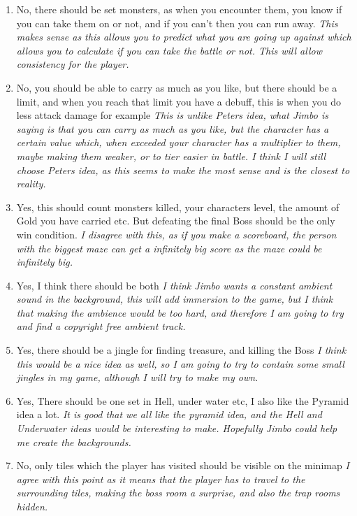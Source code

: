 \documentclass[14pt]{article}
\begin{document}
\begin{enumerate}
	\item{No, there should be set monsters, as when you encounter them, you know if you can take them on or not, and if you can't then you can run away.}
	\em{This makes sense as this allows you to predict what you are going up against which allows you to calculate if you can take the battle or not. This will allow consistency for the player.}
	
	\item{No, you should be able to carry as much as you like, but there should be a limit, and when you reach that limit you have a debuff, this is when you do less attack damage for example}
	\em{This is unlike Peters idea, what Jimbo is saying is that you can carry as much as you like, but the character has a certain value which, when exceeded your character has a multiplier to them, maybe making them weaker, or to tier easier in battle. I think I will still choose Peters idea, as this seems to make the most sense and is the closest to reality.}
	
	\item{Yes, this should count monsters killed, your characters level, the amount of Gold you have carried etc. But defeating the final Boss should be the only win condition.}
	\em{I disagree with this, as if you make a scoreboard, the person with the biggest maze can get a infinitely big score as the maze could be infinitely big.}
	
	\item{Yes, I think there should be both}
	\em{I think Jimbo wants a constant ambient sound in the background, this will add immersion to the game, but I think that making the ambience would be too hard, and therefore I am going to try and find a copyright free ambient track.}
	
	\item{Yes, there should be a jingle for finding treasure, and killing the Boss}
	\em{I think this would be a nice idea as well, so I am going to try to contain some small jingles in my game, although I will try to make my own.}
	
	\item{Yes, There should be one set in Hell, under water etc, I also like the Pyramid idea a lot.}
	\em{It is good that we all like the pyramid idea, and the Hell and Underwater ideas would be interesting to make. Hopefully Jimbo could help me create the backgrounds.}
	
	\item{No, only tiles which the player has visited should be visible on the minimap}
	\em{I agree with this point as it means that the player has to travel to the surrounding tiles, making the boss room a surprise, and also the trap rooms hidden.}
	

\end{enumerate}
\end{document}
